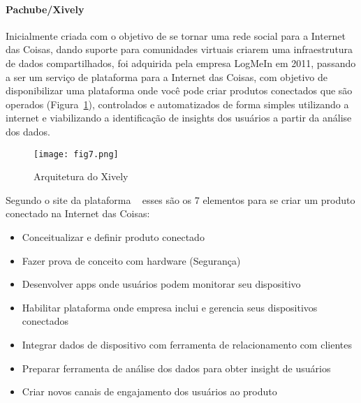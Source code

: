 
\paragraph{Pachube/Xively}
	Inicialmente criada com o objetivo de se tornar uma rede social para a Internet das Coisas, dando suporte para comunidades virtuais criarem uma infraestrutura de dados compartilhados, foi adquirida pela empresa LogMeIn em 2011, passando a ser um servi\c{c}o de plataforma para a Internet das Coisas, com objetivo de disponibilizar uma plataforma onde voc\^e pode criar produtos conectados que s\~ao operados (Figura~\ref{fig:arqxively}), controlados e automatizados de forma simples utilizando a internet e viabilizando a identifica\c{c}\~ao de insights dos usu\'arios a partir da an\'alise dos dados.
	
	\begin{figure}[ht]
		\centering
		\texttt{[image: fig7.png]}
		\caption{Arquitetura do Xively}
		\label{fig:arqxively}
	\end{figure}
	
	
	Segundo o site da plataforma ~\cite{XIVELY} esses s\~ao os 7 elementos para se criar um produto conectado na Internet das Coisas:
	
	\begin{itemize}
		\item Conceitualizar e definir produto conectado
		\item Fazer prova de conceito com hardware (Seguran\c{c}a)
		\item Desenvolver apps onde usu\'arios podem monitorar seu dispositivo
		\item Habilitar plataforma onde empresa inclui e gerencia seus dispositivos conectados
		\item Integrar dados de dispositivo com ferramenta de relacionamento com clientes 
		\item Preparar ferramenta de an\'alise dos dados para obter insight de usu\'arios
		\item Criar novos canais de engajamento dos usu\'arios ao produto
	\end{itemize}
	
